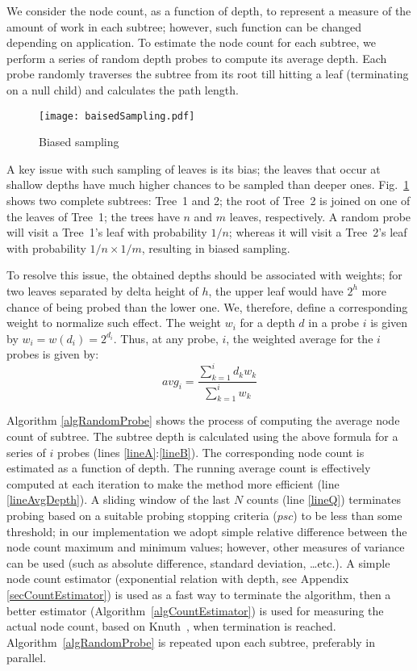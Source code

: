 \documentclass[conference,compsoc]{IEEEtran}
\begin{document}
We consider the node count, as a function of depth, 
to represent a measure of the amount of work in each subtree; however, such function can be changed depending on application. To estimate the node count for each subtree, we perform a series of random depth probes to compute its average depth. Each probe randomly traverses the subtree from its root till hitting a leaf (terminating on a null child) and calculates the path length.


\begin{figure}
	\centering
	\texttt{[image: baisedSampling.pdf]}
	\caption{\label{figBiasedSampling}Biased sampling}
\end{figure}

A key issue with such sampling of leaves is its bias; the leaves that occur at shallow depths have much higher chances to be sampled than deeper ones. Fig.~\ref{figBiasedSampling} shows two complete subtrees: Tree~1 and 2; the root of Tree~2 is joined on one of the leaves of Tree~1; the trees have $ n $ and $ m $ leaves, respectively. A random probe will visit a Tree~1's leaf with probability $ 1/n $; whereas it will visit a Tree~2's leaf with probability $ 1/n \times 1/m $, resulting in biased sampling.

To resolve this issue, the obtained depths should be associated with weights; for two leaves separated by delta height of $ h $, the upper leaf would have $ 2^h $ more chance of being probed than the lower one. We, therefore, define a corresponding weight to normalize such effect. The weight $ w_i $ for a depth $ d $ in a probe $ i $ is given by $ w_i = w(d_i) = 2^{d_i} $. Thus, at any probe, $ i $, the weighted average for the $ i $ probes is given by:
\begin{equation}
	avg_i=\frac{\sum_{k=1}^{i}d_kw_k}{\sum_{k=1}^{i}w_k}
	\label{eqAVG}
\end{equation}

Algorithm \ref{algRandomProbe} shows the process of computing the average node count of subtree. The subtree depth is calculated using the above formula for a series of $ i $ probes (lines \ref{lineA}:\ref{lineB}). The corresponding node count is estimated as a function of depth. The running average count is effectively computed at each iteration to make the method more efficient (line \ref{lineAvgDepth}). A sliding window of the last $ N $ counts (line \ref{lineQ}) terminates probing based on a suitable probing stopping criteria ($ \mathit{psc} $) to be less than some threshold; in our implementation we adopt simple relative difference between the node count maximum and minimum values; however, other measures of variance can be used (such as absolute difference, standard deviation, \dots etc.). A simple node count estimator (exponential relation with depth, see Appendix \ref{secCountEstimator}) is used as a fast way to terminate the algorithm, then a better estimator (Algorithm~\ref{algCountEstimator}) is used for measuring the actual node count, based on Knuth~\cite{knuth1975, Vaisman2015}, when termination is reached. Algorithm~\ref{algRandomProbe} is repeated upon each subtree, preferably in parallel.
 
\end{document}
